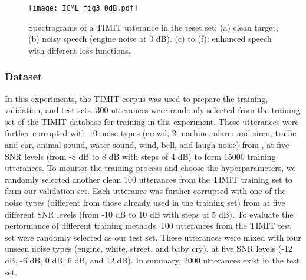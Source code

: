 \documentclass{article}
\begin{document}
\begin{figure*}[ht]
\begin{center}
\centerline{\texttt{[image: ICML\_fig3\_0dB.pdf]}}
\vskip -0.3in
\caption{Spectrograms of a TIMIT utterance in the teset set: (a) clean target, (b) noisy speech (engine noise at 0 dB). (c) to (f): enhanced speech with different loss functions. }
\label{fig:demo_different_loss}
\end{center}
\vskip -0.2in
\end{figure*}


\subsubsection{Dataset}
In this experiments, the TIMIT corpus \cite{garofolo1988getting} was used to prepare the training, validation, and test sets. 300 utterances were randomly selected from the training set of the TIMIT database for training in this experiment. These utterances were further corrupted with 10 noise types (crowd, 2 machine, alarm and siren, traffic and car, animal sound, water sound, wind, bell, and laugh noise) from \cite{hu100}, at five SNR levels (from -8 dB to 8 dB with steps of 4 dB) to form 15000 training utterances. To monitor the training process and choose the hyperparameters, we randomly selected another clean 100 utterances from the TIMIT training set to form our validation set. Each utterance was further corrupted with one of the noise types (different from those already used in the training set) from \cite{hu100} at five different SNR levels (from -10 dB to 10 dB with steps of 5 dB). To evaluate the performance of different training methods, 100 utterances from the TIMIT test set were randomly selected as our test set. These utterances were mixed with four unseen noise types (engine, white, street, and baby cry), at five SNR levels (-12 dB, -6 dB, 0 dB, 6 dB, and 12 dB). In summary, 2000 utterances exist in the test set.
\end{document}
